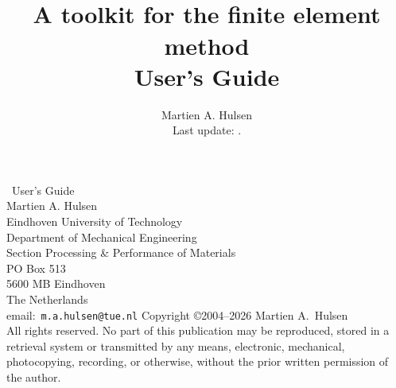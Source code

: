 \documentclass[a4paper,twoside]{report}
\date{}
\title{\tfem\\
       A toolkit for the finite element method\bigskip \\
       User's Guide}
\author{Martien A. Hulsen\bigskip\\
        {\small Last update: \headdate.} }
\begin{document}
\maketitle \newpage \thispagestyle{empty}
\vspace*{\fill}
\noindent
{\large \tfem\ User's Guide}\bigskip\\
        Martien A. Hulsen\\
        Eindhoven University of Technology\\
        Department of Mechanical Engineering\\
        Section Processing \& Performance of Materials\\
        PO Box 513\\
        5600 MB Eindhoven\\
        The Netherlands\\
        email:~\texttt{m.a.hulsen@tue.nl}\vspace*{2cm}
\vfill
\noindent
Copyright \copyright 2004--2026 Martien A.~Hulsen\medskip\\
All rights reserved. No part of this publication may be reproduced,
stored in a retrieval system or transmitted by any means,
electronic, mechanical, photocopying,
recording, or otherwise, without the prior written permission of the
author.

\clearpage

\setcounter{page}{1}

\def\chaptertitle{\contentsname}
\tableofcontents

\pagestyle{tfemch}















\appendix





\end{document}
